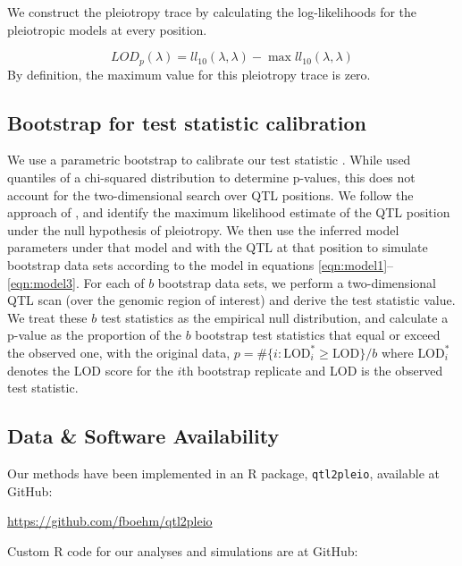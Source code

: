 \documentclass[oneside]{book}\usepackage[]{graphicx}\usepackage[]{color}
\begin{document}
We construct the pleiotropy trace by calculating the log-likelihoods
for the pleiotropic models at every position.

\begin{equation}
LOD_{p}(\lambda) = ll_{10}(\lambda, \lambda) - \max ll_{10}(\lambda, \lambda)
\label{eq:lodp}
\end{equation}
By definition, the maximum value for this pleiotropy trace
is zero.






\subsection{Bootstrap for test statistic calibration}

We use a parametric bootstrap to calibrate our test statistic
\citep{efron1979}. While \citet{jiang1995multiple} used quantiles of a
chi-squared distribution to determine p-values, this does not account
for the two-dimensional search over QTL positions.
We follow the approach of \citet{tian2016dissection}, and identify
the maximum likelihood estimate of the QTL position under the null
hypothesis of pleiotropy.
We then use the inferred model parameters under that model and with
the QTL at that position to simulate bootstrap data sets according to
the model in equations \ref{eqn:model1}--\ref{eqn:model3}.
For each of $b$ bootstrap data sets, we
perform a two-dimensional QTL scan (over the genomic region of
interest) and derive the test
statistic value. We treat these $b$ test statistics as the
empirical null distribution, and calculate a p-value as the
proportion of the $b$ bootstrap test statistics that equal or exceed
the observed one, with the original data,
$p = \# \{ i:\text{LOD}^*_i \geq \text{LOD}\} / b$
where $\text{LOD}_i^*$ denotes the LOD score for the $i$th bootstrap
replicate and LOD is the observed test statistic.



\subsection{Data \& Software Availability}

Our methods have been implemented in an R package, \texttt{qtl2pleio},
available at GitHub:

\href{https://github.com/fboehm/qtl2pleio}{https://github.com/fboehm/qtl2pleio}

\noindent Custom R code for our analyses and simulations are at GitHub:
\end{document}
